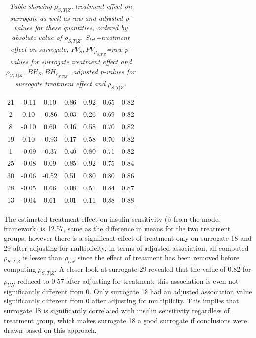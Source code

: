 \documentclass[a4paper,12pt]{article}
\begin{document}
\begin{table}[H]
{\begin{tabular}{ccccccc}
				21 & -0.11 & 0.10 & 0.86 & 0.92 & 0.65 & 0.82 \\ 
				2 & 0.10 & -0.86 & 0.03 & 0.26 & 0.69 & 0.82 \\ 
				8 & -0.10 & 0.60 & 0.16 & 0.58 & 0.70 & 0.82 \\ 
				19 & 0.10 & -0.93 & 0.17 & 0.58 & 0.70 & 0.82 \\ 
				1 & -0.09 & -0.37 & 0.40 & 0.80 & 0.71 & 0.82 \\ 
				25 & -0.08 & 0.09 & 0.85 & 0.92 & 0.75 & 0.84 \\ 
				30 & -0.06 & -0.52 & 0.51 & 0.80 & 0.80 & 0.86 \\ 
				28 & -0.05 & 0.66 & 0.08 & 0.51 & 0.84 & 0.87 \\ 
				13 & -0.04 & 0.61 & 0.01 & 0.11 & 0.88 & 0.88 \\
				\hline
			\end{tabular}  %
		}
		\caption{\emph{Table showing $\rho_{S,T|Z}$, treatment effect on surrogate as well as raw and adjusted p-values for these quantities, ordered by absolute value of $\rho_{S,T|Z}$. $S_{trt}$=treatment effect on surrogate, $PV_S,PV_{\rho_{S,T|Z}}$=raw p-values for surrogate treatment effect and $\rho_{S,T|Z}$, $BH_{S},BH_{\rho_{S,T|Z}}$=adjusted p-values for surrogate treatment effect and $\rho_{S,T|Z}$. }}\label{univariate adjusted association table}
	\end{table}
	
	The estimated treatment effect on insulin sensitivity ($\beta$ from the model framework) is 12.57, same as the difference in means for the two treatment groups, however there is a significant effect of treatment only on surrogate 18 and 29 after adjusting for multiplicity. In terms of adjusted association, all computed $\rho_{S,T|Z}$ is lesser than $\rho_{UN}$ since the effect of treatment has been removed before computing $\rho_{S,T|Z}$. A closer look at surrogate 29 revealed that the value of 0.82 for $\rho_{UN}$ reduced to 0.57 after adjusting for treatment, this association is even not significantly different from 0. Only surrogate 18 had an adjusted association value significantly different from 0 after adjusting for multiplicity. This implies that surrogate 18 is significantly correlated with insulin sensitivity regardless of treatment group, which makes surrogate 18 a good surrogate if conclusions were drawn based on this approach.
	
\end{document}

